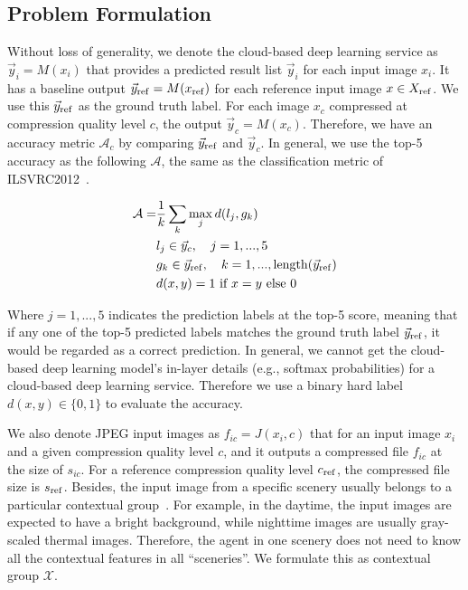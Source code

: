 \subsection{Problem Formulation}
\label{subsec: formulation}

Without loss of generality, we denote the cloud-based deep learning service as $ \vec{y}_i = M(x_i) $ that provides a predicted result list $ \vec{y}_i $ for each input image $ x_i $. It has a baseline output $ \vec{y}_{\rm ref} = M(x_{\rm ref}) $ for each reference input image $ x \in X_{\rm ref} $. We use this $ \vec{y}_{\rm ref} $ as the ground truth label. For each image $ x_c $ compressed at compression quality level $ c $, the output $ \vec{y}_c = M(x_c) $. Therefore, we have an accuracy metric $ \mathcal{A}_c $ by comparing $ \vec{y}_{\rm ref} $ and $ \vec{y}_c $. In general, we use the top-5 accuracy as the following $ \mathcal{A} $, the same as the classification metric of ILSVRC2012~\cite{ILSVRC12}.

\begin{align}
\mathcal{A} =& \frac{1}{k} \sum_{k}\max_jd(l_j, g_k) \\
& l_j \in \vec{y}_c, \quad j=1,...,5 \\
& g_k \in \vec{y}_{\rm ref}, \quad k=1, ..., {\rm length}(\vec{y}_{\rm ref}) \\
& d(x, y) = 1 \ \text{if} \ x=y  \ \text{else} \ 0 
\end{align}

Where $ j = 1,...,5 $ indicates the prediction labels at the top-5 score, meaning that if any one of the top-5 predicted labels matches the ground truth label $ \vec{y}_{\rm ref} $, it would be regarded as a correct prediction. In general, we cannot get the cloud-based deep learning model's in-layer details (e.g., softmax probabilities) for a cloud-based deep learning service. Therefore we use a binary hard label $ d(x, y) \in \{0, 1\} $ to evaluate the accuracy. %

We also denote JPEG input images as $ f_{ic} = J(x_i, c) $ that for an input image $ x_i $ and a given compression quality level $ c $, and it outputs a compressed file $ f_{ic} $ at the size of $ s_{ic} $. For a reference compression quality level $ c_{\rm ref} $, the compressed file size is $ s_{\rm ref} $. Besides, the input image from a specific scenery usually belongs to a particular contextual group~\cite{mcdnn}. For example, in the daytime, the input images are expected to have a bright background, while nighttime images are usually gray-scaled thermal images. Therefore, the agent in one scenery does not need to know all the contextual features in all ``sceneries''. We formulate this as contextual group $ \mathcal{X} $.


